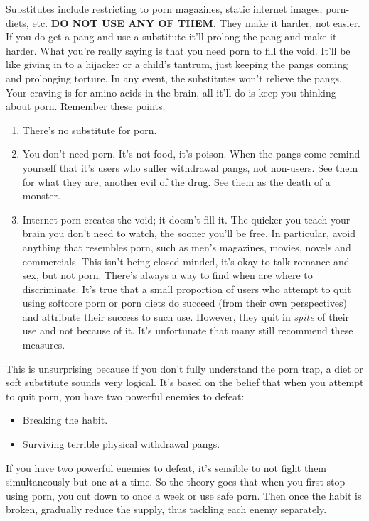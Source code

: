 \documentclass[easypeasy.tex]{subfiles}
\begin{document}
Substitutes include restricting to porn magazines, static internet images, porn-diets, etc. \textbf{DO NOT USE ANY OF THEM.} They make it harder, not easier. If you do get a pang and use a substitute it'll prolong the pang and make it harder. What you're really saying is that you need porn to fill the void. It'll be like giving in to a hijacker or a child's tantrum, just keeping the pangs coming and prolonging torture. In any event, the substitutes won't relieve the pangs. Your craving is for amino acids in the brain, all it'll do is keep you thinking about porn. Remember these points.
\begin{enumerate}
  \item There's no substitute for porn.
  \item You don't need porn. It's not food, it's poison. When the pangs come remind yourself that it's users who suffer withdrawal pangs, not non-users. See them for what they are, another evil of the drug. See them as the death of a monster.
  \item Internet porn creates the void; it doesn't fill it. The quicker you teach your brain you don't need to watch, the sooner you'll be free. In particular, avoid anything that resembles porn, such as men's magazines, movies, novels and commercials. This isn't being closed minded, it's okay to talk romance and sex, but not porn. There's always a way to find when are where to discriminate. It's true that a small proportion of users who attempt to quit using softcore porn or porn diets do succeed (from their own perspectives) and attribute their success to such use. However, they quit in \textit{spite} of their use and not because of it. It's unfortunate that many still recommend these measures.
\end{enumerate}

This is unsurprising because if you don't fully understand the porn trap, a diet or soft substitute sounds very logical. It's based on the belief that when you attempt to quit porn, you have two powerful enemies to defeat:
\begin{itemize}
  \item Breaking the habit.
  \item Surviving terrible physical withdrawal pangs.
\end{itemize}

If you have two powerful enemies to defeat, it's sensible to not fight them simultaneously but one at a time. So the theory goes that when you first stop using porn, you cut down to once a week or use safe porn. Then once the habit is broken, gradually reduce the supply, thus tackling each enemy separately.
\end{document}
